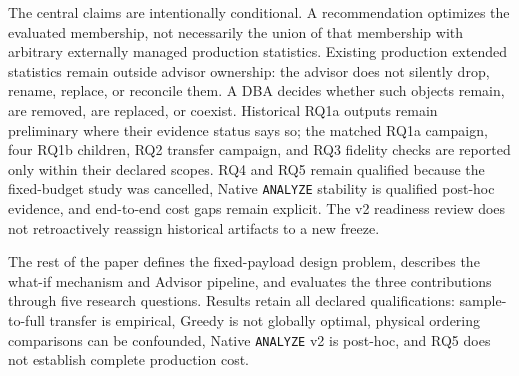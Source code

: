 The central claims are intentionally conditional. A recommendation optimizes
the evaluated membership, not necessarily the union of that membership with
arbitrary externally managed production statistics. Existing production
extended statistics remain outside advisor ownership: the advisor does not
silently drop, rename, replace, or reconcile them. A DBA decides whether such
objects remain, are removed, are replaced, or coexist. Historical RQ1a outputs
remain preliminary where their evidence status says so; the matched RQ1a
campaign, four RQ1b children, RQ2 transfer campaign, and RQ3 fidelity checks
are reported only within their declared scopes. RQ4 and RQ5 remain qualified
because the fixed-budget study was cancelled, Native \texttt{ANALYZE} stability
is qualified post-hoc evidence, and end-to-end cost gaps remain explicit.
The v2 readiness review does not retroactively reassign historical artifacts
to a new freeze.

The rest of the paper defines the fixed-payload design problem, describes the
what-if mechanism and Advisor pipeline, and evaluates the three contributions
through five research questions. Results retain all declared qualifications:
sample-to-full transfer is empirical, Greedy is not globally optimal, physical
ordering comparisons can be confounded, Native \texttt{ANALYZE} v2 is
post-hoc, and RQ5 does not establish complete production cost.
